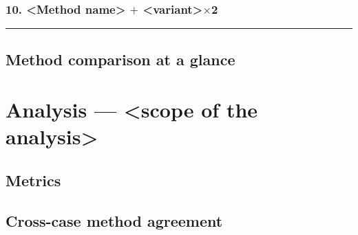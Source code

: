\documentclass[12pt,a4paper]{article}
\begin{document}
\subsubsection{\texorpdfstring{10. <Method name> $+$ <variant>$\times$2}{10. <Method name> + variant x2}}
\label{sec:method-10}

\noindent\rule{\textwidth}{0.4pt}
\FloatBarrier

\subsection{Method comparison at a glance}
\label{sec:method-comparison}
%

\section{Analysis --- <scope of the analysis>}
\label{sec:analysis}

\subsection{Metrics}
\label{sec:metrics}
%

\subsection{Cross-case method agreement}
\label{sec:cross-case-method-agreement}
%
\end{document}

